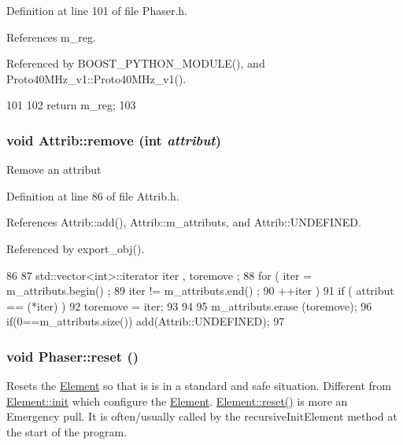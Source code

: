 Definition at line 101 of file Phaser.h.

References m\_\-reg.

Referenced by BOOST\_\-PYTHON\_\-MODULE(), and Proto40MHz\_\-v1::Proto40MHz\_\-v1().


\begin{DoxyCode}
101                  {
102     return m_reg;
103   }
\end{DoxyCode}
\hypertarget{classAttrib_a7d4ef7e32d93cb287792b87b857e79f3}{
\subsubsection[{remove}]{\setlength{\rightskip}{0pt plus 5cm}void Attrib::remove (int {\em attribut})}}
\label{classAttrib_a7d4ef7e32d93cb287792b87b857e79f3}
Remove an attribut 

Definition at line 86 of file Attrib.h.

References Attrib::add(), Attrib::m\_\-attributs, and Attrib::UNDEFINED.

Referenced by export\_\-obj().


\begin{DoxyCode}
86                                {
87     std::vector<int>::iterator iter , toremove ;
88     for ( iter  = m_attributs.begin() ;
89           iter != m_attributs.end()   ;
90           ++iter ) {
91       if ( attribut == (*iter) ) {
92         toremove = iter;
93       }
94     }
95     m_attributs.erase (toremove);
96     if(0==m_attributs.size()) add(Attrib::UNDEFINED);
97   }
\end{DoxyCode}
\hypertarget{classPhaser_a0d15908b0d50f60f4ce6c6d013f75611}{
\subsubsection[{reset}]{\setlength{\rightskip}{0pt plus 5cm}void Phaser::reset ()}}
\label{classPhaser_a0d15908b0d50f60f4ce6c6d013f75611}
Resets the \hyperlink{classElement}{Element} so that is is in a standard and safe situation. Different from \hyperlink{classElement_af42754b5cabc198869222725218d695c}{Element::init} which configure the \hyperlink{classElement}{Element}. \hyperlink{classElement_a69efffa22f06909d768149715565cb56}{Element::reset()} is more an Emergency pull. It is often/usually called by the recursiveInitElement method at the start of the program. 

